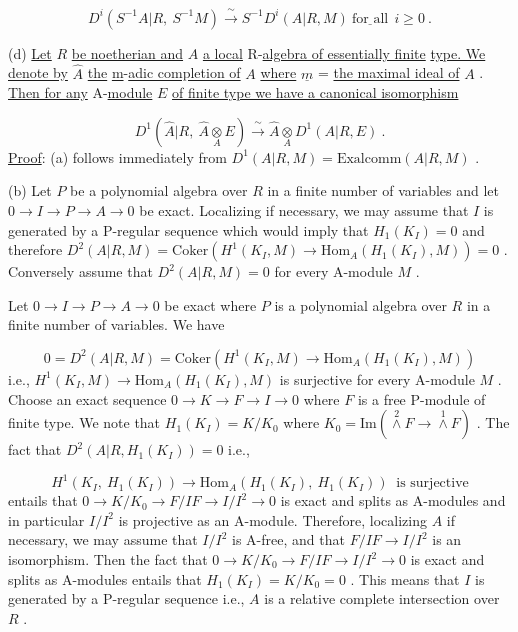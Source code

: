 \begin{equation*}
D^i(S^{-1}A|R, \ S^{-1}M) \xrightarrow{\ \sim\ } S^{-1}D^i(A|R, M)  \ \underline{\text{for all}} \ \ i \geq 0  \ .
\end{equation*}


(d)  \underline{Let}  $R$  \underline{be noetherian and}  $A$  \underline{a local} R-\underline{algebra of essentially finite} \underline{type. We denote by}  $\hat{A}$  \underline{the} \underline{m}-\underline{adic completion of}  $A$  \underline{where}  $\underline{m}$ = \underline{the maximal ideal of} $A$  .  \underline{Then for any} A-\underline{module}  $E$  \underline{of finite type we have a canonical isomorphism}

\begin{equation*}
D^1(\hat{A}|R, \ \hat{A} \underset{A}{\otimes} E) \xrightarrow{\ \sim\ } \hat{A} \underset{A}{\otimes} D^1(A|R, E)  \ .
\end{equation*}
\underline{Proof}:  (a)  follows immediately from  $D^1(A|R, M) = \mathrm{Exalcomm}(A|R, M)$ .

(b)  Let  $P$  be a polynomial algebra over  $R$  in a finite number of variables and let  $0 \to I \to P \to A \to 0$  be exact. Localizing if necessary, we may assume that  $I$  is generated by a P-regular sequence which would imply that  $H_1(K_I) = 0$ and therefore  $D^2(A|R, M) = \mathrm{Coker}(H^1(K_I, M) \to \mathrm{Hom}_A(H_1(K_I), M)) = 0$  . Conversely assume that  $D^2(A|R, M) = 0$  for every A-module  $M$  .

Let  $0 \to I \to P \to A \to 0$  be exact where  $P$  is a polynomial algebra over $R$  in a finite number of variables. We have

\begin{equation*}
0 = D^2(A|R, M) = \mathrm{Coker}(H^1(K_I, M) \to \mathrm{Hom}_A(H_1(K_I), M))
\end{equation*}
i.e.,  $H^1(K_I, M) \to \mathrm{Hom}_A(H_1(K_I), M)$  is surjective for every A-module  $M$  . Choose an exact sequence  $0 \to K \to F \to I \to 0$  where  $F$  is a free P-module of finite type. We note that  $H_1(K_I) = K/K_0$  where  $K_0 = \mathrm{Im}(\overset{2}{\wedge} F \to \overset{1}{\wedge} F)$  . The fact that $D^2(A|R, H_1(K_I)) = 0$  i.e.,

\begin{equation*}
H^1(K_I, \ H_1(K_I)) \to \mathrm{Hom}_A(H_1(K_I), \ H_1(K_I))  \ \text{ is surjective}
\end{equation*}
entails that  $0 \to K/K_0 \to F/IF \to I/I^2 \to 0$  is exact and splits as A-modules and in particular  $I/I^2$  is projective as an A-module. Therefore, localizing  $A$  if necessary, we may assume that  $I/I^2$  is  A-free, and that  $F/IF \to I/I^2$  is an isomorphism. Then the fact that  $0 \to K/K_0 \to F/IF \to I/I^2 \to 0$  is exact and splits as A-modules entails that  $H_1(K_I) = K/K_0 = 0$  . This means that  $I$  is generated by a P-regular sequence i.e.,  $A$  is a relative complete intersection over  $R$  .

